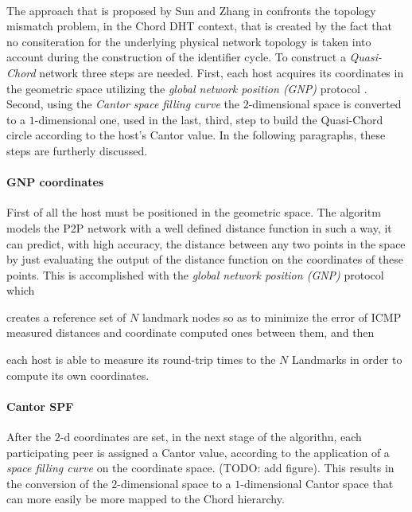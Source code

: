 \documentclass[a4paper,10pt]{article}
\begin{document}
\paragraph{}
The approach that is proposed by Sun and Zhang in \cite{sun_quasi_2008} confronts the topology mismatch problem, in the Chord DHT context, that is created by the fact that no consiteration for the underlying physical network topology is taken into account during the construction of the identifier cycle. To construct a \emph{Quasi-Chord} network three steps are needed. First, each host acquires its coordinates in the geometric space utilizing the \emph{global network position (GNP)} protocol \cite{ng_gnp_2001}. Second, using the \emph{Cantor space filling curve} the $2$-dimensional space is converted to a $1$-dimensional one, used in the last, third, step to build the Quasi-Chord circle according to the host's Cantor value. In the following paragraphs, these steps are furtherly discussed.

\paragraph{GNP coordinates}
First of all the host must be positioned in the geometric space. The algoritm models the P2P network with a well defined distance function in such a way, it can predict, with high accuracy, the distance between any two points in the space by just evaluating the output of the distance function on the coordinates of these points. This is accomplished with the \emph{global network position (GNP)} protocol which\begin{inparaenum}
  \item creates a reference set of $N$ landmark nodes so as to minimize the error of ICMP measured distances and coordinate computed ones between them, and then
  \item each host is able to measure its round-trip times to the $N$ Landmarks in order to compute its own coordinates.
\end{inparaenum}

\paragraph{Cantor SPF}
After the $2$-d coordinates are set, in the next stage of the algorithn, each participating peer is assigned a Cantor value, according to the application of a \emph{space filling curve} on the coordinate space. (TODO: add figure). This results in the conversion of the $2$-dimensional space to a $1$-dimensional Cantor space that can more easily be more mapped to the Chord hierarchy.
\end{document}
